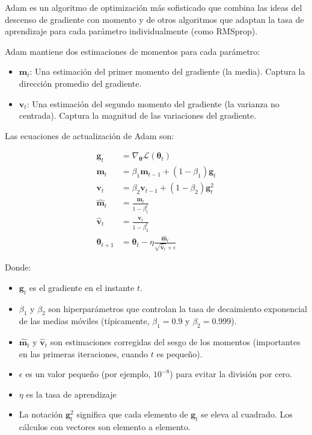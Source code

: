 \documentclass{article}
\begin{document}
Adam es un algoritmo de optimización más sofisticado que combina las ideas del descenso de gradiente con momento y de otros algoritmos que adaptan la tasa de aprendizaje para cada parámetro individualmente (como RMSprop).

Adam mantiene dos estimaciones de momentos para cada parámetro:

\begin{itemize}
    \item \(\mathbf{m}_t\):  Una estimación del primer momento del gradiente (la media).  Captura la dirección promedio del gradiente.
    \item \(\mathbf{v}_t\): Una estimación del segundo momento del gradiente (la varianza no centrada). Captura la magnitud de las variaciones del gradiente.
\end{itemize}

Las ecuaciones de actualización de Adam son:

\begin{align*}
\mathbf{g}_t &= \nabla_{\boldsymbol{\theta}} \mathcal{L}(\boldsymbol{\theta}_t) \\
\mathbf{m}_t &= \beta_1 \mathbf{m}_{t-1} + (1 - \beta_1) \mathbf{g}_t \\
\mathbf{v}_t &= \beta_2 \mathbf{v}_{t-1} + (1 - \beta_2) \mathbf{g}_t^2 \\
\hat{\mathbf{m}}_t &= \frac{\mathbf{m}_t}{1 - \beta_1^t} \\
\hat{\mathbf{v}}_t &= \frac{\mathbf{v}_t}{1 - \beta_2^t} \\
\boldsymbol{\theta}_{t+1} &= \boldsymbol{\theta}_t - \eta \frac{\hat{\mathbf{m}}_t}{\sqrt{\hat{\mathbf{v}}_t} + \epsilon}
\end{align*}

Donde:

\begin{itemize}
    \item \(\mathbf{g}_t\) es el gradiente en el instante \(t\).
    \item \(\beta_1\) y \(\beta_2\) son hiperparámetros que controlan la tasa de decaimiento exponencial de las medias móviles (típicamente, \(\beta_1 = 0.9\) y \(\beta_2 = 0.999\)).
    \item \(\hat{\mathbf{m}}_t\) y \(\hat{\mathbf{v}}_t\) son estimaciones corregidas del sesgo de los momentos (importantes en las primeras iteraciones, cuando \(t\) es pequeño).
    \item \(\epsilon\) es un valor pequeño (por ejemplo, \(10^{-8}\)) para evitar la división por cero.
    \item \(\eta\) es la tasa de aprendizaje
    \item La notación \(\mathbf{g}_t^2\) significa que cada elemento de \(\mathbf{g}_t\) se eleva al cuadrado. Los cálculos con vectores son elemento a elemento.
\end{itemize}
\end{document}
